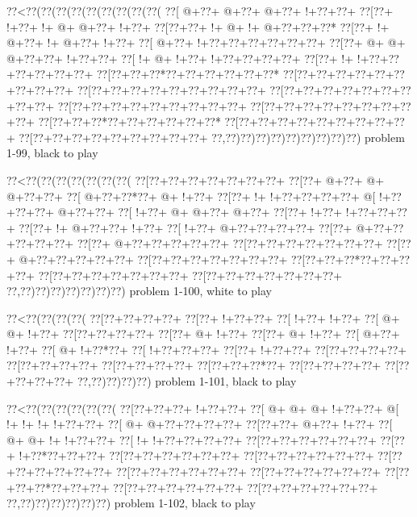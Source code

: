\vbox{\vbox{\goo
\0??<\0??(\0??(\0??(\0??(\0??(\0??(\0??(\0??(\0??(
\0??[\- @+\0??+\- @+\0??+\- @+\0??+\- !+\0??+\0??+
\0??[\0??+\- !+\0??+\- !+\- @+\- @+\0??+\- !+\0??+
\0??[\0??+\0??+\- !+\- @+\- !+\- @+\0??+\0??+\0??*
\0??[\0??+\- !+\- @+\0??+\- !+\- @+\0??+\- !+\0??+
\0??[\- @+\0??+\- !+\0??+\0??+\0??+\0??+\0??+\0??+
\0??[\0??+\- @+\- @+\- @+\0??+\0??+\- !+\0??+\0??+
\0??[\- !+\- @+\- !+\0??+\- !+\0??+\0??+\0??+\0??+
\0??[\0??+\- !+\- !+\0??+\0??+\0??+\0??+\0??+\0??+
\0??[\0??+\0??+\0??*\0??+\0??+\0??+\0??+\0??+\0??*
\0??[\0??+\0??+\0??+\0??+\0??+\0??+\0??+\0??+\0??+
\0??[\0??+\0??+\0??+\0??+\0??+\0??+\0??+\0??+\0??+
\0??[\0??+\0??+\0??+\0??+\0??+\0??+\0??+\0??+\0??+
\0??[\0??+\0??+\0??+\0??+\0??+\0??+\0??+\0??+\0??+
\0??[\0??+\0??+\0??+\0??+\0??+\0??+\0??+\0??+\0??+
\0??[\0??+\0??+\0??*\0??+\0??+\0??+\0??+\0??+\0??*
\0??[\0??+\0??+\0??+\0??+\0??+\0??+\0??+\0??+\0??+
\0??[\0??+\0??+\0??+\0??+\0??+\0??+\0??+\0??+\0??+
\0??,\0??)\0??)\0??)\0??)\0??)\0??)\0??)\0??)\0??)
}
\hfil problem 1-99, black to play\hfil\break
}

\vbox{\vbox{\goo
\0??<\0??(\0??(\0??(\0??(\0??(\0??(\0??(
\0??[\0??+\0??+\0??+\0??+\0??+\0??+\0??+
\0??[\0??+\- @+\0??+\- @+\- @+\0??+\0??+
\0??[\- @+\0??+\0??*\0??+\- @+\- !+\0??+
\0??[\0??+\- !+\- !+\0??+\0??+\0??+\0??+
\- @[\- !+\0??+\0??+\0??+\- @+\0??+\0??+
\0??[\- !+\0??+\- @+\- @+\0??+\- @+\0??+
\0??[\0??+\- !+\0??+\- !+\0??+\0??+\0??+
\0??[\0??+\- !+\- @+\0??+\0??+\- !+\0??+
\0??[\- !+\0??+\- @+\0??+\0??+\0??+\0??+
\0??[\0??+\- @+\0??+\0??+\0??+\0??+\0??+
\0??[\0??+\- @+\0??+\0??+\0??+\0??+\0??+
\0??[\0??+\0??+\0??+\0??+\0??+\0??+\0??+
\0??[\0??+\- @+\0??+\0??+\0??+\0??+\0??+
\0??[\0??+\0??+\0??+\0??+\0??+\0??+\0??+
\0??[\0??+\0??+\0??*\0??+\0??+\0??+\0??+
\0??[\0??+\0??+\0??+\0??+\0??+\0??+\0??+
\0??[\0??+\0??+\0??+\0??+\0??+\0??+\0??+
\0??,\0??)\0??)\0??)\0??)\0??)\0??)\0??)
}
\hfil problem 1-100, white to play\hfil\break
}

\vbox{\vbox{\goo
\0??<\0??(\0??(\0??(\0??(
\0??[\0??+\0??+\0??+\0??+
\0??[\0??+\- !+\0??+\0??+
\0??[\- !+\0??+\- !+\0??+
\0??[\- @+\- @+\- !+\0??+
\0??[\0??+\0??+\0??+\0??+
\0??[\0??+\- @+\- !+\0??+
\0??[\0??+\- @+\- !+\0??+
\0??[\- @+\0??+\- !+\0??+
\0??[\- @+\- !+\0??*\0??+
\0??[\- !+\0??+\0??+\0??+
\0??[\0??+\- !+\0??+\0??+
\0??[\0??+\0??+\0??+\0??+
\0??[\0??+\0??+\0??+\0??+
\0??[\0??+\0??+\0??+\0??+
\0??[\0??+\0??+\0??*\0??+
\0??[\0??+\0??+\0??+\0??+
\0??[\0??+\0??+\0??+\0??+
\0??,\0??)\0??)\0??)\0??)
}
\hfil problem 1-101, black to play\hfil\break
}

\vbox{\vbox{\goo
\0??<\0??(\0??(\0??(\0??(\0??(\0??(
\0??[\0??+\0??+\0??+\- !+\0??+\0??+
\0??[\- @+\- @+\- @+\- !+\0??+\0??+
\- @[\- !+\- !+\- !+\- !+\0??+\0??+
\0??[\- @+\- @+\0??+\0??+\0??+\0??+
\0??[\0??+\0??+\- @+\0??+\- !+\0??+
\0??[\- @+\- @+\- !+\- !+\0??+\0??+
\0??[\- !+\- !+\0??+\0??+\0??+\0??+
\0??[\0??+\0??+\0??+\0??+\0??+\0??+
\0??[\0??+\- !+\0??*\0??+\0??+\0??+
\0??[\0??+\0??+\0??+\0??+\0??+\0??+
\0??[\0??+\0??+\0??+\0??+\0??+\0??+
\0??[\0??+\0??+\0??+\0??+\0??+\0??+
\0??[\0??+\0??+\0??+\0??+\0??+\0??+
\0??[\0??+\0??+\0??+\0??+\0??+\0??+
\0??[\0??+\0??+\0??*\0??+\0??+\0??+
\0??[\0??+\0??+\0??+\0??+\0??+\0??+
\0??[\0??+\0??+\0??+\0??+\0??+\0??+
\0??,\0??)\0??)\0??)\0??)\0??)\0??)
}
\hfil problem 1-102, black to play\hfil\break
}


